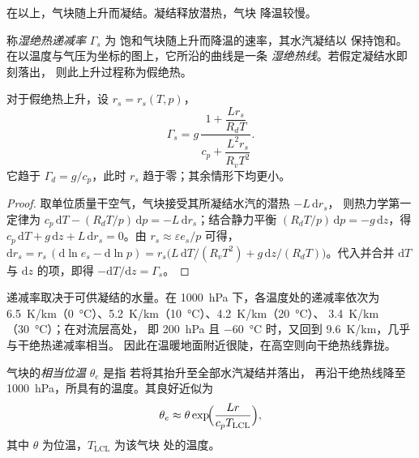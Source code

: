 在以上，气块随上升而凝结。凝结释放潜热，气块
降温较慢。

\begin{definition}\label{def:b2:atmospheric-thermodynamics:moist-adiabat}
称\emph{湿绝热递减率} $\Gamma_s$ 为
饱和气块随上升而降温的速率，其水汽凝结以
保持饱和。在以温度与气压为坐标的图上，它所沿的曲线是一条
\emph{湿绝热线}。若假定凝结水即刻落出，
则此上升过程称为假绝热。
\end{definition}

\begin{proposition}[湿绝热递减率]\label{prop:b2:atmospheric-thermodynamics:gamma-s}
对于假绝热上升，设 $r_s = r_s(T, p)$，
\[
  \Gamma_s = g\,\frac{1 + \dfrac{L r_s}{R_d T}}{c_p + \dfrac{L^2 r_s}{R_v T^2}} .
\]
它趋于 $\Gamma_d = g/c_p$，此时 $r_s$ 趋于零；其余情形下均更小。
\end{proposition}

\begin{proof}
取单位质量干空气，气块接受其所凝结水汽的潜热 $-L\,\mathrm{d}r_s$，
则热力学第一定律为 $c_p\,\mathrm{d}T - (R_dT/p)\,\mathrm{d}p = -L\,
\mathrm{d}r_s$；结合静力平衡 $(R_dT/p)\,\mathrm{d}p = -g\,\mathrm{d}z$，得
$c_p\,\mathrm{d}T + g\,\mathrm{d}z + L\,\mathrm{d}r_s = 0$。由 $r_s \approx \varepsilon e_s/p$ 可得，
$\mathrm{d}r_s = r_s\,(\mathrm{d}\ln e_s - \mathrm{d}\ln p) = r_s\bigl(L\,\mathrm{d}T/(R_vT^2) +
g\,\mathrm{d}z/(R_dT)\bigr)$。代入并合并 $\mathrm{d}T$ 与
$\mathrm{d}z$ 的项，即得 $-\mathrm{d}T/\mathrm{d}z = \Gamma_s$。
\end{proof}

递减率取决于可供凝结的水量。在 \qty{1000}{hPa} 下，各温度处的递减率依次为
\qty{6.5}{K/km}（\qty{0}{\celsius}）、\qty{5.2}{K/km}（\qty{10}{\celsius}）、\qty{4.2}{K/km}（\qty{20}{\celsius}）、
\qty{3.4}{K/km}（\qty{30}{\celsius}）；在对流层高处，
即 \qty{200}{hPa} 且 \qty{-60}{\celsius} 时，又回到 \qty{9.6}{K/km}，几乎与干绝热递减率相当。
因此在温暖地面附近很陡，在高空则向干绝热线靠拢。

\begin{definition}[相当位温]\label{def:b2:atmospheric-thermodynamics:theta-e}
气块的\emph{相当位温} $\theta_e$ 是指
若将其抬升至全部水汽凝结并落出，
再沿干绝热线降至 \qty{1000}{hPa}，所具有的温度。其良好近似为
\[
  \theta_e \approx \theta \exp\!\Bigl(\frac{L r}{c_p T_{\text{LCL}}}\Bigr),
\]
其中 $\theta$ 为位温，$T_{\text{LCL}}$ 为该气块
处的温度。
\end{definition}

